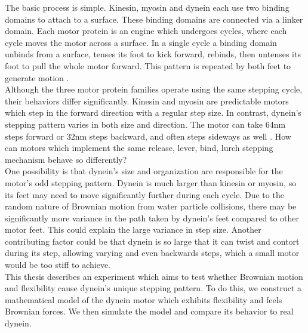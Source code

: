 \documentclass[
11pt, %
english, %
singlespacing, %
headsepline, %
chapterinoneline, %
]{MastersDoctoralThesis} %
\begin{document}
The basic process is simple. Kinesin, myosin and dynein each use two binding domains to attach to a surface. These binding domains are connected via a linker domain. Each motor protein is an engine which undergoes cycles, where each cycle moves the motor across a surface. In a single cycle a binding domain unbinds from a surface, tenses its foot to kick forward, rebinds, then untenses its foot to pull the whole motor forward. This pattern is repeated by both feet to generate motion \cite{kinesin-cycle, myosin-cycle}.\\

Although the three motor protein families operate using the same stepping cycle, their behaviors differ significantly. Kinesin and myosin are predictable motors which step in the forward direction with a regular step size. In contrast, dynein's stepping pattern varies in both size and direction. The motor can take 64nm steps forward or 32nm steps backward, and often steps sideways as well \cite{weihongpaper}. How can motors which implement the same release, lever, bind, lurch stepping mechanism behave so differently?\\

One possibility is that dynein's size and organization are responsible for the motor's odd stepping pattern. Dynein is much larger than kinesin or myosin, so its feet may need to move significantly further during each cycle. Due to the random nature of Brownian motion from water particle collisions, there may be significantly more variance in the path taken by dynein's feet compared to other motor feet. This could explain the large variance in step size. Another contributing factor could be that dynein is so large that it can twist and contort during its step, allowing varying and even backwards steps, which a small motor would be too stiff to achieve.\\

This thesis describes an experiment which aims to test whether Brownian motion and flexibility cause dynein's unique stepping pattern. To do this, we construct a mathematical model of the dynein motor which exhibits flexibility and feels Brownian forces. We then simulate the model and compare its behavior to real dynein.\\

\end{document}
